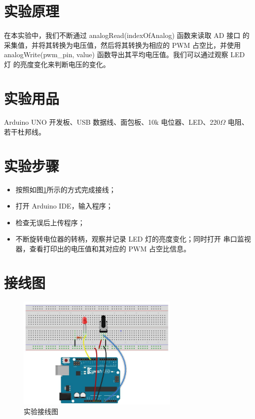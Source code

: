 \documentclass[UTF8, oneside]{ctexbook}
\begin{document}
\section{实验原理}
\paragraph{}
在本实验中，我们不断通过 analogRead(indexOfAnalog) 函数来读取 AD 接口
的采集值，并将其转换为电压值，然后将其转换为相应的 PWM 占空比，并使用 
analogWrite(pwm\_pin, value) 函数导出其平均电压值。我们可以通过观察 LED 灯
的亮度变化来判断电压的变化。

\section{实验用品}
\paragraph{}
Arduino UNO 开发板、USB 数据线、面包板、10k 电位器、LED、220$\Omega$ 电阻、若干杜邦线。

\section{实验步骤}
\begin{itemize}
    \item[(1)] 按照如图\ref{b7_line}所示的方式完成接线；
    \item[(2)] 打开 Arduino IDE，输入程序；
    \item[(3)] 检查无误后上传程序；
    \item[(4)] 不断旋转电位器的转柄，观察并记录 LED 灯的亮度变化；同时打开
    串口监视器，查看打印出的电压值和其对应的 PWM 占空比信息。   
\end{itemize}

\section{接线图}
\begin{figure}[h]
    \centering
    \includegraphics[width=0.7\textwidth]{./result/basic/7/lines.png}
    \caption{实验接线图}
    \label{b7_line}
\end{figure}
\end{document}
